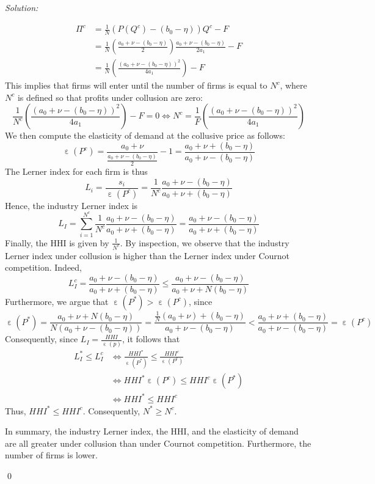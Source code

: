 \documentclass[12pt]{article}
\DeclareMathOperator{\eps}{\varepsilon}
\newenvironment{sol}
    {\emph{Solution:}
    }
    {
    \qed
    }
\begin{document}
\begin{sol}
\begin{enumerate}[label=\alph*) ]
     \begin{align*}\Pi^c &= \frac{1}{N} \left( P(Q^c) - (b_0 - \eta)\right)Q^c - F\\
        &= \frac{1}{N} \left(\frac{a_0 + \nu - (b_0 - \eta)}{2} \right)\frac{a_0 + \nu - (b_0 - \eta)}{2 a_1} - F\\
        &= \frac{1}{N}\left( \frac{(a_0 + \nu - (b_0 - \eta))^2}{4 a_1}\right) - F
    \end{align*}
    This implies that firms will enter until the number of firms is equal to $N^c$, where $N^c$ is defined so that profits under collusion are zero:
\[\frac{1}{N^c}\left( \frac{(a_0 + \nu - (b_0 - \eta))^2}{4 a_1}\right) - F = 0 \iff N^c = \frac{1}{F}\left( \frac{(a_0 + \nu - (b_0 - \eta))^2}{4 a_1}\right)\]
We then compute the elasticity of demand at the collusive price as follows:
\[\eps(P^c) = \frac{a_0 + \nu}{\frac{a_0 + \nu - (b_0 - \eta)}{2}} - 1 = \frac{a_0 + \nu + (b_0 - \eta)}{a_0 + \nu - (b_0 - \eta)}\]
The Lerner index for each firm is thus
\[L_i = \frac{s_i}{\eps(P^c)} = \frac{1}{N^c} \frac{a_0 + \nu - (b_0 - \eta)}{a_0 + \nu + (b_0 - \eta)}\]
Hence, the industry Lerner index is
\[L_I = \sum_{i=1}^{N^c} \frac{1}{N^c }\frac{a_0 + \nu - (b_0 - \eta)}{a_0 + \nu + (b_0 - \eta)} = \frac{a_0 + \nu - (b_0 - \eta)}{a_0 + \nu + (b_0 - \eta)} \]
Finally, the HHI is given by $\frac{1}{N^c}$. By inspection, we observe that the industry Lerner index under collusion is higher than the Lerner index under Cournot competition. Indeed,
\[L_I^c = \frac{a_0 + \nu - (b_0 - \eta)}{a_0 + \nu + (b_0 - \eta)} \leq \frac{a_0 + \nu - (b_0 - \eta)}{a_0 + \nu + N(b_0 - \eta)}\]
Furthermore, we argue that $\eps(P^*) > \eps(P^c)$, since
\[\eps(P^*) = \frac{a_0 + \nu + N(b_0 - \eta)}{N(a_0 + \nu - (b_0 - \eta))} =\frac{\frac{1}{N}(a_0 + \nu) + (b_0 - \eta)}{a_0 + \nu - (b_0 - \eta)} < \frac{a_0 + \nu + (b_0 - \eta)}{a_0 + \nu - (b_0 - \eta)} = \eps(P^c) \]
Consequently, since $L_I = \frac{HHI}{\eps(p)}$, it follows that
\begin{align*}L_I^* \leq L_I^c &\iff \frac{HHI^*}{\eps(P^*)} \leq \frac{HHI^c}{\eps(P^c)} \\
&\iff HHI^* \eps(P^c) \leq HHI^c \eps(P^*)\\
&\iff HHI^* \leq HHI^c
\end{align*}
Thus, $HHI^* \leq HHI^c$. Consequently, $N^* \geq N^c$.

In summary, the industry Lerner index, the HHI, and the elasticity of demand are all greater under collusion than under Cournot competition. Furthermore, the number of firms is lower.
\end{enumerate}
\end{sol}
\end{document}
